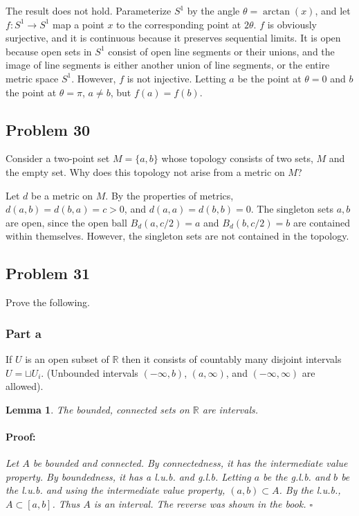 \documentclass{article}
\newenvironment{proof}{\paragraph{Proof:}}{\hfill$\square$}
\newtheorem{lemma}[theorem]{Lemma}
\begin{document}
The result does not hold. Parameterize $S^1$ by the angle $\theta = \arctan(x)$, and let $f: S^1 \rightarrow S^1$ map a point $x$ to the corresponding point at $2\theta$. $f$ is obviously surjective, and it is continuous because it preserves sequential limits. It is open because open sets in $S^1$ consist of open line segments or their unions, and the image of line segments is either another union of line segments, or the entire metric space $S^1$. However, $f$ is not injective. Letting $a$ be the point at $\theta=0$ and $b$ the point at $\theta = \pi$, $a\neq b$, but $f(a) = f(b)$.

\subsection*{Problem 30}

Consider a two-point set $M = \{a, b\}$ whose topology consists of two sets, $M$ and the empty set. Why does this topology not arise from a metric on $M$?

Let $d$ be a metric on $M$. By the properties of metrics, $d(a, b) = d(b, a) = c > 0$, and $d(a, a) = d(b, b) = 0$. The singleton sets ${a}, {b}$ are open, since the open ball $B_d(a, c/2) = {a}$ and $B_d(b, c/2) = {b}$ are contained within themselves. However, the singleton sets are not contained in the topology.  

\subsection*{Problem 31}
Prove the following.
\subsubsection*{Part a}
If $U$ is an open subset of $\mathbb{R}$ then it consists of countably many disjoint intervals $U = \sqcup U_i$. (Unbounded intervals $(-\infty, b)$, $(a, \infty)$, and $(-\infty, \infty)$ are allowed).

\begin{lemma}
\label{ConnectedSetsAreIntervals}
The bounded, connected sets on $\mathbb{R}$ are intervals.
\begin{proof}
Let $A$ be bounded and connected. By connectedness, it has the intermediate value property. By boundedness, it has a l.u.b. and g.l.b. Letting $a$ be the g.l.b. and $b$ be the l.u.b. and using the intermediate value property, $(a, b) \subset A$. By the l.u.b., $A \subset [a, b]$. Thus $A$ is an interval. The reverse was shown in the book.
\end{proof}
\end{lemma}
\end{document}

